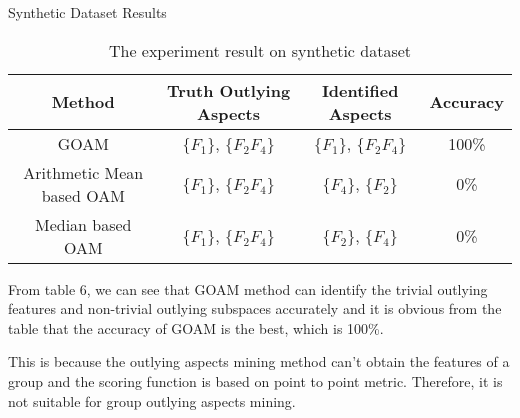 \documentclass[
size=14pt,
paper=smartboard,  %
mode=present, 		%
display=slides, 	%
style=tuliplab,  	%
pauseslide,
fleqn,leqno]{powerdot}
\begin{document}
\begin{slide}[toc=,bm=]{Synthetic Dataset Results}
	
	\begin{table}[tb]
		\setlength{\abovecaptionskip}{0pt}
		\setlength{\belowcaptionskip}{10pt}
		\centering
		\caption{The experiment result on synthetic dataset}
		
		\begin{tabular}{ c | c | c | c }
			\toprule
			Method     &  Truth Outlying Aspects    & Identified Aspects & Accuracy      \\
			\midrule
			GOAM       &  $\{F_1\}$, $\{F_2F_4\}$   &  $\{F_1\}$, $\{F_2F_4\}$    & 100\%    \\
			
			Arithmetic Mean based OAM &  $\{F_1\}$, $\{F_2F_4\}$   &  $\{F_4\}$, $\{F_2\}$    &  0\% \\
			
			Median based OAM &  $\{F_1\}$, $\{F_2F_4\}$   &  $\{F_2\}$, $\{F_4\}$    &           0\% \\
			\bottomrule
		\end{tabular}
	\end{table}
	
	\begin{note}
		From table $6$,
		we can see that GOAM method can identify the trivial outlying features
		and non-trivial outlying subspaces accurately and
		it is obvious from the table that the accuracy of GOAM is the best,
		which is 100\%.
		
		This is because the outlying aspects mining method
		can't obtain the features of a group and the scoring function
		is based on point to point metric.
		Therefore,
		it is not suitable for group outlying aspects mining.
	\end{note}
	
\end{slide}
\end{document}
